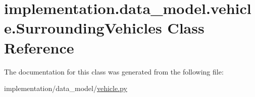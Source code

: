 \hypertarget{classimplementation_1_1data__model_1_1vehicle_1_1_surrounding_vehicles}{}\section{implementation.\+data\+\_\+model.\+vehicle.\+Surrounding\+Vehicles Class Reference}
\label{classimplementation_1_1data__model_1_1vehicle_1_1_surrounding_vehicles}


The documentation for this class was generated from the following file\+:\begin{DoxyCompactItemize}
\item 
implementation/data\+\_\+model/\hyperlink{vehicle_8py}{vehicle.\+py}\end{DoxyCompactItemize}
